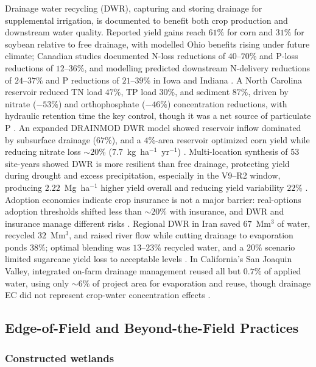 Drainage water recycling (DWR), capturing and storing drainage for
supplemental irrigation, is documented to benefit both crop production and
downstream water quality. Reported yield gains reach $61\%$ for corn and
$31\%$ for soybean relative to free drainage, with modelled Ohio benefits
rising under future climate; Canadian studies documented N-loss reductions
of $40$--$70\%$ and P-loss reductions of $12$--$36\%$, and modelling
predicted downstream N-delivery reductions of $24$--$37\%$ and P reductions
of $21$--$39\%$ in Iowa and Indiana \parencite{Hay2021}. A North Carolina
reservoir reduced TN load $47\%$, TP load $30\%$, and sediment $87\%$,
driven by nitrate ($-53\%$) and orthophosphate ($-46\%$) concentration
reductions, with hydraulic retention time the key control, though it was a
net source of particulate P \parencite{Moursi2023}. An expanded DRAINMOD
DWR model showed reservoir inflow dominated by subsurface drainage
($67\%$), and a $4\%$-area reservoir optimized corn yield while reducing
nitrate loss $\sim20\%$ ($7.7$~kg~ha$^{-1}$~yr$^{-1}$)
\parencite{Moursi2022}. Multi-location synthesis of 53 site-years showed
DWR is more resilient than free drainage, protecting yield during drought
and excess precipitation, especially in the V9--R2 window, producing
$2.22$~Mg~ha$^{-1}$ higher yield overall and reducing yield variability
$22\%$ \parencite{Willison2021}. Adoption economics indicate crop insurance
is not a major barrier: real-options adoption thresholds shifted less than
$\sim20\%$ with insurance, and DWR and insurance manage different risks
\parencite{Sellars2022}. Regional DWR in Iran saved $67$~Mm$^3$ of water,
recycled $32$~Mm$^3$, and raised river flow while cutting drainage to
evaporation ponds $38\%$; optimal blending was $13$--$23\%$ recycled water,
and a $20\%$ scenario limited sugarcane yield loss to acceptable levels
\parencite{Kosari2024}. In California's San Joaquin Valley, integrated
on-farm drainage management reused all but $0.7\%$ of applied water, using
only $\sim6\%$ of project area for evaporation and reuse, though drainage
EC did not represent crop-water concentration effects
\parencite{Ayars2014}.

\subsection{Edge-of-Field and Beyond-the-Field Practices}

\subsubsection{Constructed wetlands}

